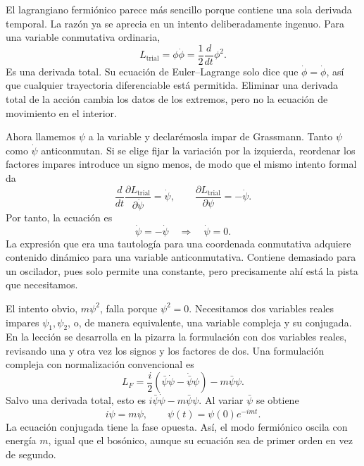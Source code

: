 El lagrangiano fermiónico parece más sencillo porque contiene una sola derivada temporal. La razón ya se aprecia en un intento deliberadamente ingenuo. Para una variable conmutativa ordinaria,
\begin{equation}
L_{\mathrm{trial}}=\phi\dot\phi
=\frac{1}{2}\frac{d}{dt}\phi^2.
\end{equation}
Es una derivada total. Su ecuación de Euler--Lagrange solo dice que \(\dot\phi=\dot\phi\), así que cualquier trayectoria diferenciable está permitida. Eliminar una derivada total de la acción cambia los datos de los extremos, pero no la ecuación de movimiento en el interior.

Ahora llamemos \(\psi\) a la variable y declarémosla impar de Grassmann. Tanto \(\psi\) como \(\dot\psi\) anticonmutan. Si se elige fijar la variación por la izquierda, reordenar los factores impares introduce un signo menos, de modo que el mismo intento formal da
\begin{equation}
\frac{d}{dt}\frac{\partial L_{\mathrm{trial}}}{\partial\dot\psi}
=\dot\psi,
\qquad
\frac{\partial L_{\mathrm{trial}}}{\partial\psi}
=-\dot\psi.
\end{equation}
Por tanto, la ecuación es
\begin{equation}
\dot\psi=-\dot\psi
\quad\Longrightarrow\quad
\dot\psi=0.
\label{eq:l7-constant-fermion}
\end{equation}
La expresión que era una tautología para una coordenada conmutativa adquiere contenido dinámico para una variable anticonmutativa. Contiene demasiado para un oscilador, pues solo permite una constante, pero precisamente ahí está la pista que necesitamos.

\begin{classroomqa}
\end{classroomqa}

El intento obvio, \(m\psi^2\), falla porque \(\psi^2=0\). Necesitamos dos variables reales impares \(\psi_1,\psi_2\), o, de manera equivalente, una variable compleja y su conjugada. En la lección se desarrolla en la pizarra la formulación con dos variables reales, revisando una y otra vez los signos y los factores de dos. Una formulación compleja con normalización convencional es
\begin{equation}
L_F=\frac{i}{2}
\left(\bar\psi\dot\psi-\dot{\bar\psi}\psi\right)
-m\bar\psi\psi.
\label{eq:l7-fermion-lagrangian}
\end{equation}
Salvo una derivada total, esto es \(i\bar\psi\dot\psi-m\bar\psi\psi\). Al variar \(\bar\psi\) se obtiene
\begin{equation}
i\dot\psi=m\psi,
\qquad
\psi(t)=\psi(0)e^{-imt}.
\label{eq:l7-fermion-eom}
\end{equation}
La ecuación conjugada tiene la fase opuesta. Así, el modo fermiónico oscila con energía \(m\), igual que el bosónico, aunque su ecuación sea de primer orden en vez de segundo.

